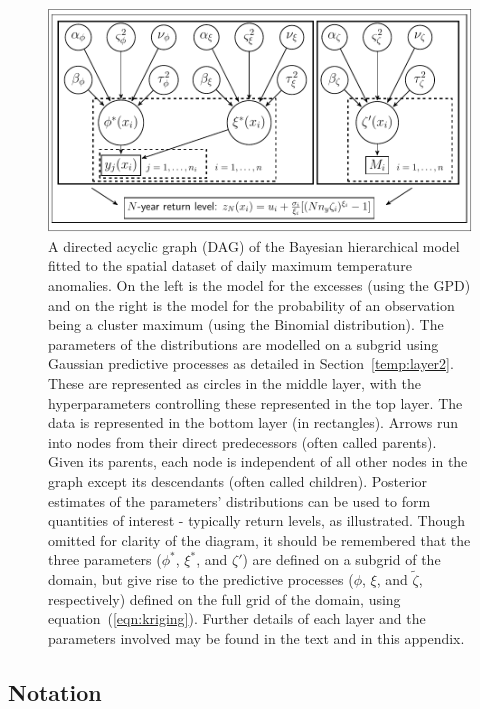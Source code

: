 \documentclass{article}
\begin{document}
\begin{figure}[H]
    \centering
       \includegraphics[width=1\textwidth,keepaspectratio]{cropped-dag.pdf}
      \caption{A directed acyclic graph (DAG) of the Bayesian hierarchical model fitted to the spatial dataset of daily maximum temperature anomalies. On the left is the model for the excesses (using the GPD) and on the right is the model for the probability of an observation being a cluster maximum (using the Binomial distribution). The parameters of the distributions are modelled on a subgrid using Gaussian predictive processes as detailed in Section~\ref{temp:layer2}. These are represented as circles in the middle layer, with the hyperparameters controlling these represented in the top layer. The data is represented in the bottom layer (in rectangles). Arrows run into nodes from their direct predecessors (often called parents). Given its parents, each node is independent of all other nodes in the graph except its descendants (often called children). Posterior estimates of the parameters' distributions can be used to form quantities of interest - typically return levels, as illustrated. Though omitted for clarity of the diagram, it should be remembered that the three parameters ($\phi^*$, $\xi^*$, and $\zeta'$) are defined on a subgrid of the domain, but give rise to the predictive processes ($\phi$, $\xi$, and $\tilde{\zeta}$, respectively) defined on the full grid of the domain, using equation~(\ref{eqn:kriging}). Further details of each layer and the parameters involved may be found in the text and in this appendix.}
      \label{fig:DAG3}
\end{figure}

\clearpage
\subsection*{Notation}
\end{document}
